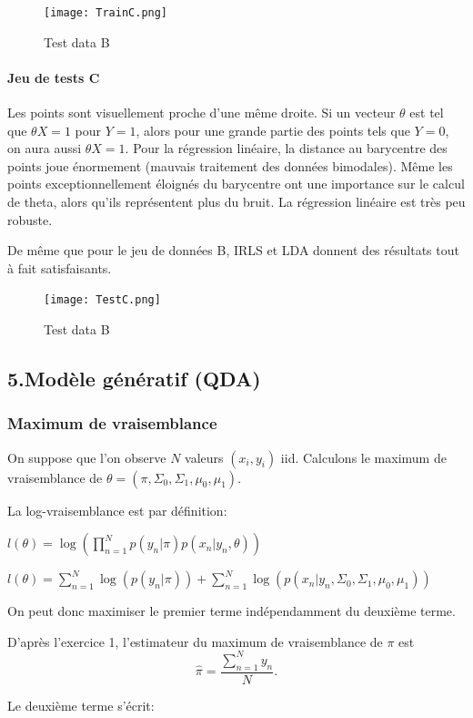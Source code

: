 \documentclass{article}
\begin{document}
\begin{figure}[H]
\caption{Test data B}
\texttt{[image: TrainC.png]}
\end{figure}

\paragraph{Jeu de tests C}

Les points sont visuellement proche d'une même droite. Si un vecteur $\theta$
est tel que $\theta X = 1$ pour $Y = 1$, alors pour une grande partie des
points tels que $Y = 0$, on aura aussi $\theta X = 1$. Pour la régression
linéaire, la distance au barycentre des points joue énormement (mauvais
traitement des données bimodales). Même les points exceptionnellement éloignés
du barycentre ont une importance sur le calcul de theta, alors qu'ils
représentent plus du bruit. La régression linéaire est très peu robuste.

De même que pour le jeu de données B, IRLS et LDA donnent des résultats tout à
fait satisfaisants.

\begin{figure}[H]
\caption{Test data B}
\texttt{[image: TestC.png]}
\end{figure}


\subsection{5.Modèle génératif (QDA)}
\subsubsection{Maximum de vraisemblance }
On suppose que l'on observe $N$ valeurs $(x_i, y_i)$ iid. Calculons le maximum de vraisemblance de $\theta=(\pi, \Sigma_{0}, \Sigma_{1}, \mu_0, \mu_1)$.

La log-vraisemblance est par définition:

$l(\theta) = \log(\prod_{n=1}^N p (y_n | \pi)  p(x_{ n}|y_n, \theta))$

$l(\theta) = \sum_{n=1}^N \log(p(y_n |\pi)) + \sum_{n=1}^{N} \log(p(x_{ n}|y_n,  \Sigma_{0}, \Sigma_{1}, \mu_0, \mu_1))$

On peut donc maximiser le premier terme indépendamment du deuxième terme.

D'après l'exercice 1, l'estimateur du maximum de vraisemblance de $\pi$ est $$\hat{\pi} = \frac{\sum_{n=1}^{N} y_{n}}{N}.$$

Le deuxième terme s'écrit:
\end{document}
